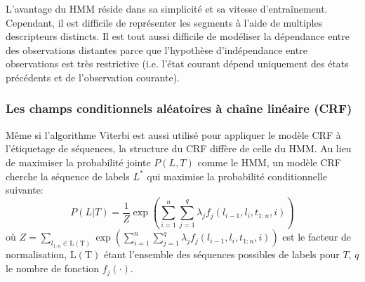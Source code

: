 L'avantage du HMM réside dans sa simplicité et sa vitesse d'entraînement. Cependant, il est difficile de représenter les segments à l'aide de multiples descripteurs distincts. Il est tout aussi difficile de modéliser la dépendance entre des observations distantes parce que l'hypothèse d'indépendance entre observations est très restrictive (i.e. l'état courant dépend uniquement des états précédents et de l'observation courante).

\subsubsection{Les champs conditionnels aléatoires à chaîne linéaire (CRF)}
\label{sec:structuration:litérature-CRF}

Même si l'algorithme Viterbi est aussi utilisé pour appliquer le modèle CRF à l'étiquetage de séquences, la structure du CRF diffère de celle du HMM. Au lieu de maximiser la probabilité jointe $ P(L, T)$ comme le HMM, un modèle CRF \citep{lafferty2001crfie} cherche la séquence de labels $L^*$ qui maximise la probabilité conditionnelle suivante: \[P(L|T) = \frac{1}{Z}\exp \left(\sum\limits_{i=1}^n\sum\limits_{j=1}^q \lambda_j f_j(l_{i-1},l_i,t_{1:n},i)\right)\] où $Z = \sum\limits_{l_{1:n} \in \mathrm{L(T)}}\exp \left(\sum\limits_{i=1}^n\sum\limits_{j=1}^q \lambda_j f_j(l_{i-1},l_i,t_{1:n},i)\right)$ est le facteur de normalisation, $\mathrm{L(T)}$ étant l'ensemble des séquences possibles de labels pour $T$, $q$ le nombre de fonction $f_j(\cdot)$.

